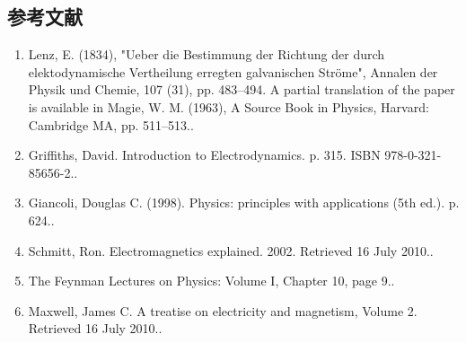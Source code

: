 \subsection{参考文献}

\begin{enumerate}
\item Lenz, E. (1834), "Ueber die Bestimmung der Richtung der durch elektodynamische Vertheilung erregten galvanischen Ströme", Annalen der Physik und Chemie, 107 (31), pp. 483–494. A partial translation of the paper is available in Magie, W. M. (1963), A Source Book in Physics, Harvard: Cambridge MA, pp. 511–513..
\item Griffiths, David. Introduction to Electrodynamics. p. 315. ISBN 978-0-321-85656-2..
\item Giancoli, Douglas C. (1998). Physics: principles with applications (5th ed.). p. 624..
\item Schmitt, Ron. Electromagnetics explained. 2002. Retrieved 16 July 2010..
\item The Feynman Lectures on Physics: Volume I, Chapter 10, page 9..
\item Maxwell, James C. A treatise on electricity and magnetism, Volume 2. Retrieved 16 July 2010..
\end{enumerate}
